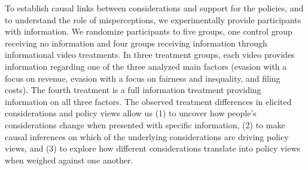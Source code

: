 \documentclass[12pt]{article}
\begin{document}
To establish causal links between considerations and support for the policies, and to understand the role of misperceptions, we experimentally provide participants with information. We randomize participants to five groups, one control group receiving no information and four groups receiving information through informational video treatments. In three treatment groups, each video provides information regarding one of the three analyzed main factors (evasion with a focus on revenue, evasion with a focus on fairness and inequality, and filing costs). The fourth treatment is a full information treatment providing information on all three factors. The observed treatment differences in elicited considerations and policy views allow us (1) to uncover how people's considerations change when presented with specific information, (2) to make causal inferences on which of the underlying considerations are driving policy views, and (3) to explore how different considerations translate into policy views when weighed against one another.


\end{document}
